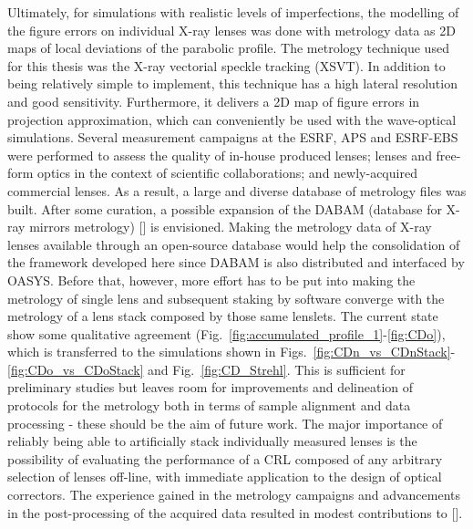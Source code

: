 \begin{refsection}
Ultimately, for simulations with realistic levels of imperfections, the modelling of the figure errors on individual X-ray lenses was done with metrology data as 2D maps of local deviations of the parabolic profile. The metrology technique used for this thesis was the X-ray vectorial speckle tracking (XSVT). In addition to being relatively simple to implement, this technique has a high lateral resolution and good sensitivity. Furthermore, it delivers a 2D map of figure errors in projection approximation, which can conveniently be used with the wave-optical simulations. 
Several measurement campaigns at the ESRF, APS and ESRF-EBS were performed to assess the quality of in-house produced lenses; lenses and free-form optics in the context of scientific collaborations; and newly-acquired commercial lenses. As a result, a large and diverse database of metrology files was built. After some curation, a possible expansion of the DABAM (database for X-ray mirrors metrology) [\cite{SanchezDelRio2016}] is envisioned. Making the metrology data of X-ray lenses available through an open-source database would help the consolidation of the framework developed here since DABAM is also distributed and interfaced by OASYS. Before that, however, more effort has to be put into making the metrology of single lens and subsequent staking by software converge with the metrology of a lens stack composed by those same lenslets. The current state show some qualitative agreement (Fig.~\ref{fig:accumulated_profile_1}-\ref{fig:CDo}), which is transferred to the simulations shown in Figs.~\ref{fig:CDn_vs_CDnStack}-\ref{fig:CDo_vs_CDoStack} and Fig.~\ref{fig:CD_Strehl}. This is sufficient for preliminary studies but leaves room for improvements and delineation of protocols for the metrology both in terms of sample alignment and data processing - these should be the aim of future work. The major importance of reliably being able to artificially stack individually measured lenses is the possibility of evaluating the performance of a CRL composed of any arbitrary selection of lenses off-line, with immediate application to the design of optical correctors. The experience gained in the metrology campaigns and advancements in the post-processing of the acquired data resulted in modest contributions to [\cite{Berujon2020a,Berujon2020,Qiao2020b}].


\end{refsection}
